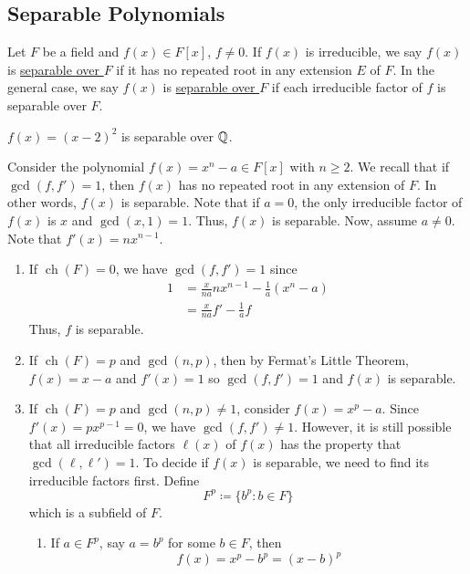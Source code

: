 \documentclass[11pt]{article}
\DeclareMathOperator{\ch}{ch}
\begin{document}
\subsection{Separable Polynomials}
\begin{definition}
Let $F$ be a field and $f(x) \in F[x]$, $f \neq 0$. If $f(x)$ is irreducible, we
say $f(x)$ is \underline{separable over $F$} if it has no repeated root in any
extension $E$ of $F$. In the general case, we say $f(x)$ is \underline{separable
over $F$} if each irreducible factor of $f$ is separable over $F$.
\end{definition}
\begin{example}
$f(x) = (x-2)^2$ is separable over $\mathbb{Q}$.
\end{example}
\begin{example}
Consider the polynomial $f(x) = x^n - a \in F[x]$ with $n \geq 2$. We recall
that if $\gcd(f, f') = 1$, then $f(x)$ has no repeated root in any extension of
$F$. In other words, $f(x)$ is separable. Note that if $a = 0$, the only
irreducible factor of $f(x)$ is $x$ and $\gcd(x, 1) = 1$. Thus, $f(x)$ is
separable. Now, assume $a \neq 0$. Note that $f'(x) = nx^{n-1}$.
\begin{enumerate}[(1)]
\item If $\ch(F) = 0$, we have $\gcd(f,f') = 1$ since
\begin{align*}
1 &= \frac{x}{na}nx^{n-1} - \frac{1}{a}(x^n-a)\\
&= \frac{x}{na}f' - \frac{1}{a}f
\end{align*}
Thus, $f$ is separable.
\item If $\ch(F) = p$ and $\gcd(n,p)$, then by Fermat's Little Theorem, $f(x) =
x - a$ and $f'(x) = 1$ so $\gcd(f,f') = 1$ and $f(x)$ is separable.
\item If $\ch(F) = p$ and $\gcd(n,p) \neq 1$, consider $f(x) = x^p - a$. Since
$f'(x) = px^{p-1} = 0$, we have $\gcd(f,f') \neq 1$. However, it is still
possible that all irreducible factors $\ell(x)$ of $f(x)$ has the property that
$\gcd(\ell, \ell') = 1$. To decide if $f(x)$ is separable, we need to find its
irreducible factors first. Define
\begin{equation*}
F^p \coloneqq \{b^p : b \in F\}
\end{equation*}
which is a subfield of $F$.
\begin{enumerate}[(3.1)]
\item If $a \in F^p$, say $a = b^p$ for some $b \in F$, then
\begin{equation*}
f(x) = x^p - b^p = (x-b)^p \tag{by Binomial Theorem}

\end{equation*}
\end{enumerate}
\end{enumerate}
\end{example}
\end{document}
